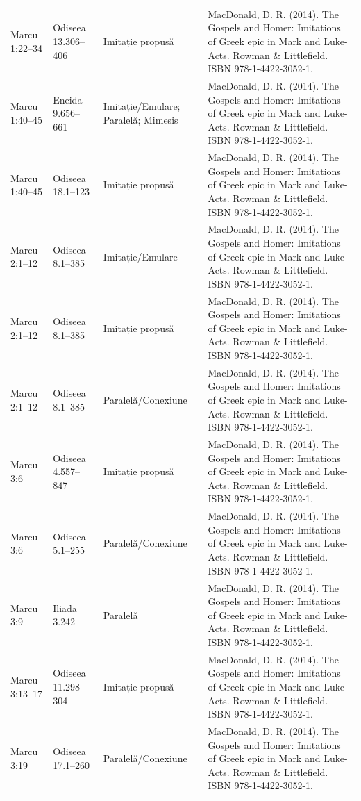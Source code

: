 \documentclass[12pt,a4paper,twoside,openany]{book}
\begin{document}
\begin{longtable}{L{1.4cm}L{1.7cm}L{3.1cm}L{8.4cm}}
Marcu 1:22–34 & Odiseea 13.306–406 & Imitație propusă & MacDonald, D. R. (2014). The Gospels and Homer: Imitations of Greek epic in Mark and Luke-Acts. Rowman \& Littlefield. ISBN 978-1-4422-3052-1. \\
Marcu 1:40–45 & Eneida 9.656–661 & Imitație/Emulare; Paralelă; Mimesis & MacDonald, D. R. (2014). The Gospels and Homer: Imitations of Greek epic in Mark and Luke-Acts. Rowman \& Littlefield. ISBN 978-1-4422-3052-1. \\
Marcu 1:40–45 & Odiseea 18.1–123 & Imitație propusă & MacDonald, D. R. (2014). The Gospels and Homer: Imitations of Greek epic in Mark and Luke-Acts. Rowman \& Littlefield. ISBN 978-1-4422-3052-1. \\
Marcu 2:1–12 & Odiseea 8.1–385 & Imitație/Emulare & MacDonald, D. R. (2014). The Gospels and Homer: Imitations of Greek epic in Mark and Luke-Acts. Rowman \& Littlefield. ISBN 978-1-4422-3052-1. \\
Marcu 2:1–12 & Odiseea 8.1–385 & Imitație propusă & MacDonald, D. R. (2014). The Gospels and Homer: Imitations of Greek epic in Mark and Luke-Acts. Rowman \& Littlefield. ISBN 978-1-4422-3052-1. \\
Marcu 2:1–12 & Odiseea 8.1–385 & Paralelă/Conexiune & MacDonald, D. R. (2014). The Gospels and Homer: Imitations of Greek epic in Mark and Luke-Acts. Rowman \& Littlefield. ISBN 978-1-4422-3052-1. \\
Marcu 3:6 & Odiseea 4.557–847 & Imitație propusă & MacDonald, D. R. (2014). The Gospels and Homer: Imitations of Greek epic in Mark and Luke-Acts. Rowman \& Littlefield. ISBN 978-1-4422-3052-1. \\
Marcu 3:6 & Odiseea 5.1–255 & Paralelă/Conexiune & MacDonald, D. R. (2014). The Gospels and Homer: Imitations of Greek epic in Mark and Luke-Acts. Rowman \& Littlefield. ISBN 978-1-4422-3052-1. \\
Marcu 3:9 & Iliada 3.242 & Paralelă & MacDonald, D. R. (2014). The Gospels and Homer: Imitations of Greek epic in Mark and Luke-Acts. Rowman \& Littlefield. ISBN 978-1-4422-3052-1. \\
Marcu 3:13–17 & Odiseea 11.298–304 & Imitație propusă & MacDonald, D. R. (2014). The Gospels and Homer: Imitations of Greek epic in Mark and Luke-Acts. Rowman \& Littlefield. ISBN 978-1-4422-3052-1. \\
Marcu 3:19 & Odiseea 17.1–260 & Paralelă/Conexiune & MacDonald, D. R. (2014). The Gospels and Homer: Imitations of Greek epic in Mark and Luke-Acts. Rowman \& Littlefield. ISBN 978-1-4422-3052-1. \\

\end{longtable}
\end{document}
